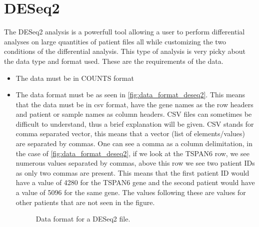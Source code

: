 \documentclass[11pt]{article}
\begin{document}
\section{DESeq2 \label{DESeq2}}
The DESeq2 analysis is a powerfull tool allowing a user to perform differential analyses on large quantities of patient files all while customizing the two conditions of the differential analysis. This type of analysis is very picky about the data type and format used. These are the requirements of the data.
\begin{itemize}
\item The data must be in COUNTS format
\item The data format must be as seen in \autoref{fig:data_format_deseq2}.
This means that the data must be in csv format, have the gene names as the row headers and patient or sample names as column headers.
CSV files can sometimes be difficult to understand, thus a brief explanation will be given. CSV stands for comma separated vector, this means that a vector (list of elements/values) are separated by commas. One can see a comma as a column delimitation, in the case of \autoref{fig:data_format_deseq2}, if we look at the TSPAN6 row, we see numerous values separated by commas, above this row we see two patient IDs as only two commas are present. This means that the first patient ID would have a  value of 4280 for the TSPAN6 gene and the second patient would have a value of 5096 for the same gene. The values following these are values for other patients that are not seen in the figure.

\begin{figure}[h!]
\centering
{}
\caption{Data format for a DESeq2 file.}
\label{fig:data_format_deseq2}
\end{figure}


\end{itemize}
\end{document}
